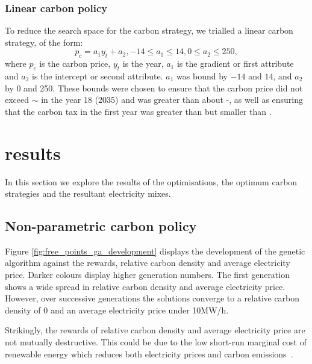 \documentclass[sigconf]{acmart}
\begin{document}
 \subsubsection{Linear carbon policy}
 \label{sssec:linear_carbon_strategy}
 To reduce the search space for the carbon strategy, we trialled a linear carbon strategy, of the form:
 \begin{equation}
 	p_c=a_1y_t+a_2, -14 \leq a_1\leq 14, 0 \leq a_2\leq 250,
 \end{equation}
 \noindent where $p_c$ is the carbon price, $y_t$ is the year, $a_1$ is the gradient or first attribute and $a_2$ is the intercept or second attribute. $a_1$ was bound by $-14$ and $14$, and $a_2$ by 0 and 250. These bounds were chosen to ensure that the carbon price did not exceed ${\sim}$ in the year 18 (2035) and was greater than about -, as well as ensuring that the carbon tax in the first year was greater than  but smaller than .

\section{results}
\label{sec:results}

In this section we explore the results of the optimisations, the optimum carbon strategies and the resultant electricity mixes.

\subsection{Non-parametric carbon policy}
\label{sssec:result_non_parametric_strategy}

Figure \ref{fig:free_points_ga_development} displays the development of the genetic algorithm against the rewards, relative carbon density and average electricity price. Darker colours display higher generation numbers. The first generation shows a wide spread in relative carbon density and average electricity price. However, over successive generations the solutions converge to a relative carbon density of 0 and an average electricity price under \textsterling10MW/h. 

Strikingly, the rewards of relative carbon density and average electricity price are not mutually destructive. This could be due to the low short-run marginal cost of renewable energy which reduces both electricity prices and carbon emissions~\cite{OMahoney2011}.
\end{document}
